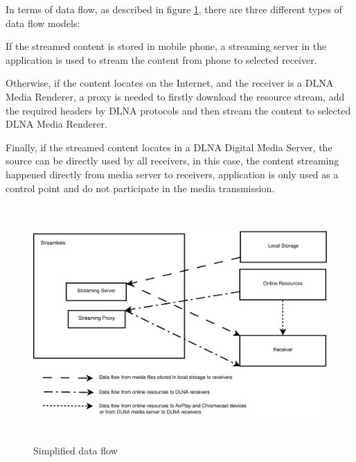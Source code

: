In terms of data flow, as described in figure \ref{chart4}, there are three
different types of data flow models: 

If the streamed content is stored in mobile phone, a streaming server in the
application is used to stream the content from phone to selected receiver.

Otherwise, if the content locates on the Internet, and the receiver is a DLNA
Media Renderer, a proxy is needed to firstly download the resource stream, add
the required headers by DLNA protocols and then stream the content to selected
DLNA Media Renderer.

Finally, if the streamed content locates in a DLNA Digital Media Server, the
source can be directly used by all receivers, in this case, the content
streaming happened directly from media server to receivers, application is only
used as a control point and do not participate in the media transmission.

\begin{figure}[htb]
\centering \includegraphics[height=9cm]{charts/data_flow}
\caption{Simplified data flow \label{chart4}}
\end{figure}

